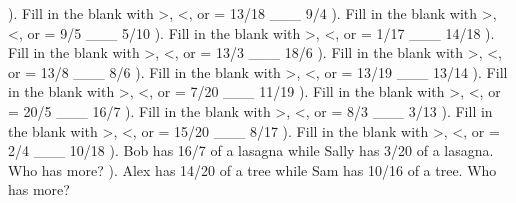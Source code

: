\documentclass{article}%
\begin{document}
). Fill in the blank with >, <, or = 13/18 \_\_\_ 9/4%
\newline%
\newline%
). Fill in the blank with >, <, or = 9/5 \_\_\_ 5/10%
\newline%
\newline%
). Fill in the blank with >, <, or = 1/17 \_\_\_ 14/18%
\newline%
\newline%
). Fill in the blank with >, <, or = 13/3 \_\_\_ 18/6%
\newline%
\newline%
). Fill in the blank with >, <, or = 13/8 \_\_\_ 8/6%
\newline%
\newline%
). Fill in the blank with >, <, or = 13/19 \_\_\_ 13/14%
\newline%
\newline%
). Fill in the blank with >, <, or = 7/20 \_\_\_ 11/19%
\newline%
\newline%
). Fill in the blank with >, <, or = 20/5 \_\_\_ 16/7%
\newline%
\newline%
). Fill in the blank with >, <, or = 8/3 \_\_\_ 3/13%
\newline%
\newline%
). Fill in the blank with >, <, or = 15/20 \_\_\_ 8/17%
\newline%
\newline%
). Fill in the blank with >, <, or = 2/4 \_\_\_ 10/18%
\newline%
\newline%
). Bob has 16/7 of a lasagna while Sally has 3/20 of a lasagna. Who has more?%
\newline%
\newline%
). Alex has 14/20 of a tree while Sam has 10/16 of a tree. Who has more?%
\end{document}
